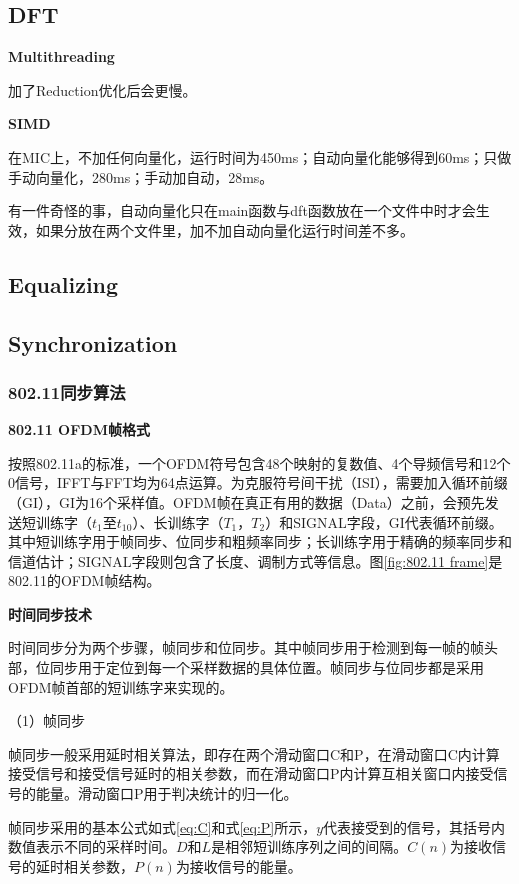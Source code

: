 \documentclass[titlepage]{article}
\numberwithin{figure}{section}
\numberwithin{equation}{section}
\begin{document}
\subsection{DFT}

\textbf{Multithreading}

加了Reduction优化后会更慢。

\textbf{SIMD}

在MIC上，不加任何向量化，运行时间为450ms；自动向量化能够得到60ms；只做手动向量化，280ms；手动加自动，28ms。

有一件奇怪的事，自动向量化只在main函数与dft函数放在一个文件中时才会生效，如果分放在两个文件里，加不加自动向量化运行时间差不多。

\subsection{Equalizing}

\subsection{Synchronization}

\subsubsection{802.11同步算法}

\textbf{802.11 OFDM帧格式}

按照802.11a的标准，一个OFDM符号包含48个映射的复数值、4个导频信号和12个0信号，IFFT与FFT均为64点运算。为克服符号间干扰（ISI），需要加入循环前缀（GI），GI为16个采样值。OFDM帧在真正有用的数据（Data）之前，会预先发送短训练字（$t_{1}$至$t_{10}$）、长训练字（$T_{1}$，$T_{2}$）和SIGNAL字段，GI代表循环前缀。其中短训练字用于帧同步、位同步和粗频率同步；长训练字用于精确的频率同步和信道估计；SIGNAL字段则包含了长度、调制方式等信息。图\ref{fig:802.11 frame}是802.11的OFDM帧结构。

\textbf{时间同步技术}

时间同步分为两个步骤，帧同步和位同步。其中帧同步用于检测到每一帧的帧头部，位同步用于定位到每一个采样数据的具体位置。帧同步与位同步都是采用OFDM帧首部的短训练字来实现的。

（1）帧同步

帧同步一般采用延时相关算法，即存在两个滑动窗口C和P，在滑动窗口C内计算接受信号和接受信号延时的相关参数，而在滑动窗口P内计算互相关窗口内接受信号的能量。滑动窗口P用于判决统计的归一化。

帧同步采用的基本公式如式\ref{eq:C}和式\ref{eq:P}所示，$y$代表接受到的信号，其括号内数值表示不同的采样时间。$D$和$L$是相邻短训练序列之间的间隔。$C(n)$为接收信号的延时相关参数，$P(n)$为接收信号的能量。
\end{document}
